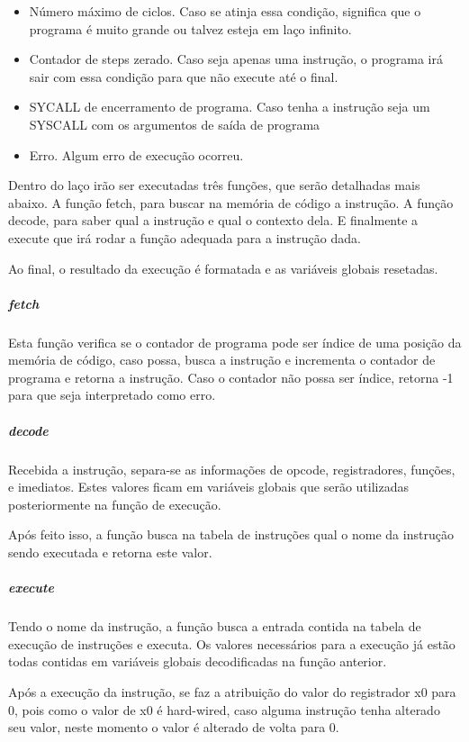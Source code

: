 					\begin{itemize} 
						\item Número máximo de ciclos. Caso se atinja essa condição, significa que o programa é muito grande ou talvez esteja em laço infinito.
						\item Contador de steps zerado. Caso seja apenas uma instrução, o programa irá sair com essa condição para que não execute até o final.
						\item SYCALL de encerramento de programa. Caso tenha a instrução seja um SYSCALL com os argumentos de saída de programa
						\item Erro. Algum erro de execução ocorreu.
						
					\end{itemize}

					Dentro do laço irão ser executadas três funções, que serão detalhadas mais abaixo. A função fetch, para buscar na memória de código a instrução. A função decode, para saber qual a instrução e qual o contexto dela. E finalmente a execute que irá rodar a função adequada para a instrução dada.

					Ao final, o resultado da execução é formatada e as variáveis globais resetadas.

				\subparagraph{fetch}
				
					Esta função verifica se o contador de programa pode ser índice de uma posição da memória de código, caso possa, busca a instrução e incrementa o contador de programa e retorna a instrução. Caso o contador não possa ser índice, retorna -1 para que seja interpretado como erro.

				\subparagraph{decode}
					
					Recebida a instrução, separa-se as informações de opcode, registradores, funções, e imediatos. Estes valores ficam em variáveis globais que serão utilizadas posteriormente na função de execução.

					Após feito isso, a função busca na tabela de instruções qual o nome da instrução sendo executada e retorna este valor.


				\subparagraph{execute}
			
					Tendo o nome da instrução, a função busca a entrada contida na tabela de execução de instruções e executa. Os valores necessários para a execução já estão todas contidas em variáveis globais decodificadas na função anterior.

					Após a execução da instrução, se faz a atribuição do valor do registrador x0 para 0, pois como o valor de x0 é hard-wired, caso alguma instrução tenha alterado seu valor, neste momento o valor é alterado de volta para 0.



